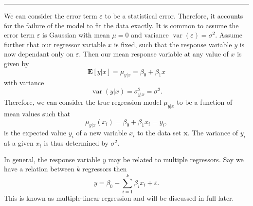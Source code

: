 \documentclass[10pt,a4paper, twocolumn, conference]{IEEEtran}
\DeclareMathOperator{\var}{var}
\begin{document}
\hrule
\vspace{3mm}
We can consider the error term $\varepsilon$ to be a statistical error. Therefore, it accounts for the failure of the model to fit the data exactly. It is common to assume the error term $\varepsilon$ is Gaussian with mean $\mu = 0$ and variance $\var(\varepsilon) = \sigma^2$. Assume further that our regressor variable $x$ is fixed, such that the response variable $y$ is now dependant only on $\varepsilon$. Then our mean response variable at any value of $x$ is given by
\begin{equation}
\mathbf{E}[y|x] = \mu_{y|x} = \beta_0 + \beta_1 x
\end{equation}
with variance
\begin{equation}
\var(y|x) = \sigma_{y|x}^2 = \sigma^2.
\end{equation}
Therefore, we can consider the true regression model $\mu_{y|x}$ to be a function of mean values such that
\begin{equation}
\mu_{y|x}(x_i) = \beta_0 + \beta_1 x_i = y_i,
\end{equation}
is the expected value $y_i$ of a new variable $x_i$ to the data set $\mathbf{x}$. The variance of $y_i$ at a given $x_i$ is thus determined by $\sigma^2$.

In general, the response variable $y$ may be related to multiple regressors. Say we have a relation between $k$ regressors then
\begin{equation}
y = \beta_0 + \sum_{i = 1}^k \beta_i x_i + \varepsilon.
\end{equation}
This is known as multiple-linear regression and will be discussed in full later.
\end{document}
